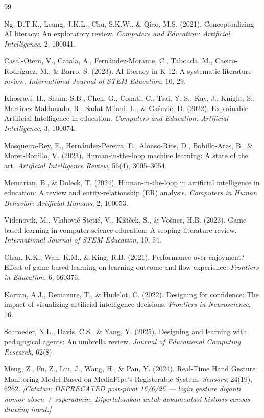 \documentclass[12pt,a4paper,oneside,openany]{report}
\begin{document}
\begin{thebibliography}{99}

Ng, D.T.K., Leung, J.K.L., Chu, S.K.W., \& Qiao, M.S. (2021). Conceptualizing AI literacy: An exploratory review. \textit{Computers and Education: Artificial Intelligence}, 2, 100041.

Casal-Otero, V., Catala, A., Fern\'andez-Morante, C., Taboada, M., Caeiro-Rodr\'iguez, M., \& Barro, S. (2023). AI literacy in K-12: A systematic literature review. \textit{International Journal of STEM Education}, 10, 29.

Khosravi, H., Shum, S.B., Chen, G., Conati, C., Tsai, Y.-S., Kay, J., Knight, S., Martinez-Maldonado, R., Sadat-Milani, L., \& Ga\v{s}evi\'c, D. (2022). Explainable Artificial Intelligence in education. \textit{Computers and Education: Artificial Intelligence}, 3, 100074.

Mosqueira-Rey, E., Hern\'andez-Pereira, E., Alonso-R\'ios, D., Bobillo-Ares, B., \& Moret-Bonillo, V. (2023). Human-in-the-loop machine learning: A state of the art. \textit{Artificial Intelligence Review}, 56(4), 3005--3054.

Memarian, B., \& Doleck, T. (2024). Human-in-the-loop in artificial intelligence in education: A review and entity-relationship (ER) analysis. \textit{Computers in Human Behavior: Artificial Humans}, 2, 100053.

Videnovik, M., Vlahovi\v{c}-Steti\'c, V., Kišiček, S., \& Vošner, H.B. (2023). Game-based learning in computer science education: A scoping literature review. \textit{International Journal of STEM Education}, 10, 54.

Chan, K.K., Wan, K.M., \& King, R.B. (2021). Performance over enjoyment? Effect of game-based learning on learning outcome and flow experience. \textit{Frontiers in Education}, 6, 660376.

Karran, A.J., Demazure, T., \& Hudelot, C. (2022). Designing for confidence: The impact of visualizing artificial intelligence decisions. \textit{Frontiers in Neuroscience}, 16.


Schroeder, N.L., Davis, C.S., \& Yang, Y. (2025). Designing and learning with pedagogical agents: An umbrella review. \textit{Journal of Educational Computing Research}, 62(8).

Meng, Z., Fu, Z., Liu, J., Wang, H., \& Pan, Y. (2024). Real-Time Hand Gesture Monitoring Model Based on MediaPipe's Registerable System. \textit{Sensors}, 24(19), 6262. \textit{[Catatan: DEPRECATED post-pivot 16/6/26 --- login gesture diganti nomor absen + superadmin. Dipertahankan untuk dokumentasi historis canvas drawing input.]}


\end{thebibliography}
\end{document}
